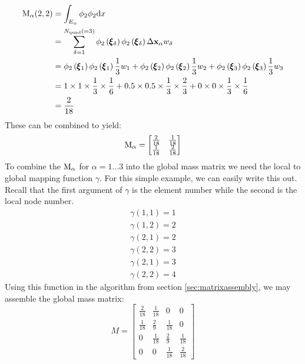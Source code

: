 \documentclass[a4paper, 11pt]{book}
\begin{document}
\begin{equation}
  \begin{split}
    \mathrm{M}_\alpha(2,2)&=\int_{E_\alpha} \phi_2\phi_2 \mathrm{d} x\\
    &=\sum_{\delta=1}^{N_\mathrm{quad}(=3)} 
    \phi_2\left(\pmb{\xi}_\delta\right)\phi_2\left(\pmb{\xi}_\delta\right)\Delta\mathbf{x}_\alpha w_\delta\\
    &=\phi_2\left(\pmb{\xi}_1\right)\phi_2\left(\pmb{\xi}_1\right)\frac{1}{3}w_1+
    \phi_2\left(\pmb{\xi}_2\right)\phi_2\left(\pmb{\xi}_2\right)\frac{1}{3}w_2+
    \phi_2\left(\pmb{\xi}_3\right)\phi_2\left(\pmb{\xi}_3\right)\frac{1}{3}w_3\\
    &=1\times1\times\frac{1}{3}\times\frac{1}{6}+0.5\times0.5\times\frac{1}{3}\times\frac{2}{3}+0\times0\times\frac{1}{3}\times\frac{1}{6}\\
    &=\frac{2}{18}
  \end{split}
\end{equation}
These can be combined to yield:
\begin{equation}
  \mathrm{M}_\alpha=
  \begin{bmatrix}
    \frac{2}{18} & \frac{1}{18}\\
    \frac{1}{18} & \frac{2}{18}
  \end{bmatrix}
\end{equation}
To combine the $\mathrm{M}_\alpha$ for $\alpha=1\ldots3$ into the global mass matrix
we need the local to global mapping function $\gamma$. For this simple
example, we can easily write this out. Recall that the first argument of
$\gamma$ is the element number while the second is the local node number.
\begin{gather*}
  \gamma(1,1)=1\\
  \gamma(1,2)=2\\
  \gamma(2,1)=2\\
  \gamma(2,2)=3\\
  \gamma(2,1)=3\\
  \gamma(2,2)=4
\end{gather*}
Using this function in the algorithm from section \ref{sec:matrixassembly},
we may assemble the global mass matrix:
\begin{equation}
  M=
  \begin{bmatrix}
    \frac{2}{18} & \frac{1}{18} & 0 & 0\\
    \frac{1}{18} & \frac{2}{9} &  \frac{1}{18} & 0\\
    0& \frac{1}{18} & \frac{2}{9} &  \frac{1}{18} \\
    0& 0& \frac{1}{18} & \frac{2}{18}
  \end{bmatrix}
\end{equation}
\end{document}
